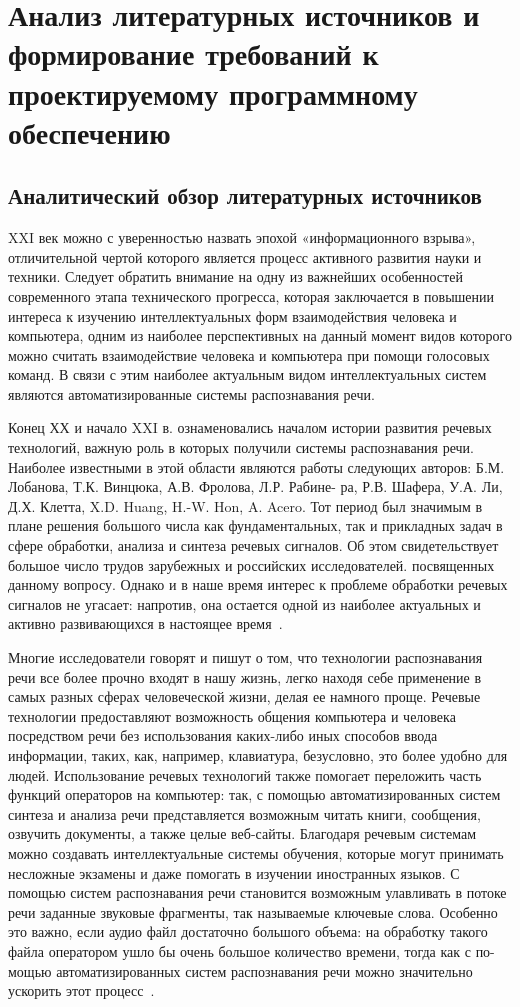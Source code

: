 \section{Анализ литературных источников и формирование требований к проектируемому программному обеспечению}

\subsection{Аналитический обзор литературных источников}

XXI век можно с уверенностью назвать эпохой «информационного взрыва», отличительной чертой которого является процесс активного развития науки и техники. Следует обратить внимание на одну из важнейших особенностей современного этапа технического прогресса, которая заключается
в повышении интереса к изучению интеллектуальных форм
взаимодействия человека и компьютера, одним из наиболее
перспективных на данный момент видов которого можно
считать взаимодействие человека и компьютера при помощи голосовых команд. В связи с этим наиболее актуальным
видом интеллектуальных систем являются автоматизированные системы распознавания речи.

Конец ХХ и начало XXI в. ознаменовались началом истории развития речевых технологий, важную роль в которых получили системы распознавания речи. Наиболее известными в этой области являются работы следующих авторов:
Б.М. Лобанова, Т.К. Винцюка, А.В. Фролова, Л.Р. Рабине-
ра, Р.В. Шафера, У.А. Ли, Д.Х. Клетта, X.D. Huang, H.-W. Hon,
A. Acero. Тот период был значимым в плане решения большого числа как фундаментальных, так и прикладных задач
в сфере обработки, анализа и синтеза речевых сигналов.
Об этом свидетельствует большое число трудов зарубежных
и российских исследователей. посвященных данному вопросу. Однако и в наше время интерес к проблеме обработки
речевых сигналов не угасает: напротив, она остается одной
из наиболее актуальных и активно развивающихся в настоящее время~\cite{LL1}.


Многие исследователи говорят и пишут о том, что технологии распознавания речи все более прочно входят в нашу жизнь, легко находя себе применение в самых разных сферах человеческой жизни, делая ее намного проще. Речевые технологии предоставляют возможность общения компьютера и человека посредством речи без использования каких-либо иных способов ввода информации, таких, как, например, клавиатура, безусловно, это более удобно для людей. Использование речевых технологий также помогает переложить часть функций операторов на компьютер: так, с помощью автоматизированных систем синтеза и анализа речи представляется возможным читать книги, сообщения, озвучить документы, а также целые веб-сайты. Благодаря речевым системам можно создавать интеллектуальные системы обучения, которые могут принимать несложные экзамены и даже помогать в изучении иностранных языков. С помощью систем распознавания речи становится возможным улавливать в потоке речи
заданные звуковые фрагменты, так называемые ключевые
слова. Особенно это важно, если аудио файл достаточно
большого объема: на обработку такого файла оператором
ушло бы очень большое количество времени, тогда как с по-
мощью автоматизированных систем распознавания речи
можно значительно ускорить этот процесс~\cite{LL2}.


